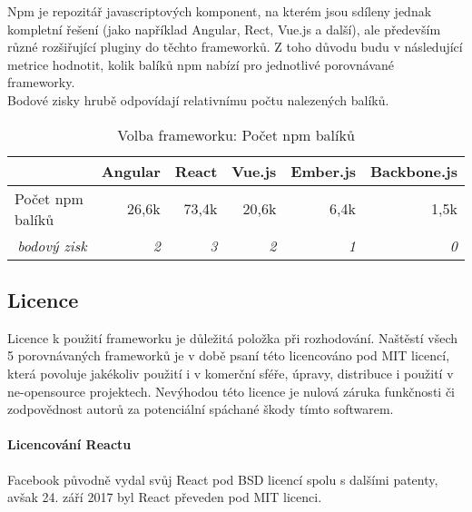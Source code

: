 Npm\cite{npm} je repozitář javascriptových komponent, na kterém jsou sdíleny jednak kompletní řešení (jako například Angular, Rect, Vue.js a další), ale především různé rozšiřující pluginy do těchto frameworků. Z toho důvodu budu v následující metrice hodnotit, kolik balíků npm nabízí pro jednotlivé porovnávané frameworky.
\\
Bodové zisky hrubě odpovídají relativnímu počtu nalezených balíků.

\begin{table}[h]
\caption{Volba frameworku: Počet npm balíků}
\label{table:compare:npm}
\begin{tabular}{lrrrrr}
\hline
                                         & \multicolumn{1}{c}{Angular} & \multicolumn{1}{c}{React} & \multicolumn{1}{c}{Vue.js} & \multicolumn{1}{c}{Ember.js} & \multicolumn{1}{c}{Backbone.js} \\ \hline
Počet npm balíků                         & 26,6k                       & 73,4k                     & 20,6k                      & 6,4k                         & 1,5k                            \\
\multicolumn{1}{r}{\textit{bodový zisk}} & \textit{2}                  & \textit{3}                & \textit{2}                 & \textit{1}                   & \textit{0}                  
\end{tabular}
\end{table}


\subsection{Licence}

Licence k použití frameworku je důležitá položka při rozhodování. Naštěstí všech 5 porovnávaných frameworků je v době psaní této licencováno pod MIT licencí, která povoluje jakékoliv použití i v komerční sféře, úpravy, distribuce i použití v ne-opensource projektech. Nevýhodou této licence je nulová záruka funkčnosti či zodpovědnost autorů za potenciální spáchané škody tímto softwarem.
\\
\paragraph{Licencování Reactu} Facebook původně vydal svůj React pod BSD licencí spolu s dalšími patenty, avšak 24. září 2017 byl React převeden pod MIT licenci\cite{react-license-commit}\cite{react-license}.

